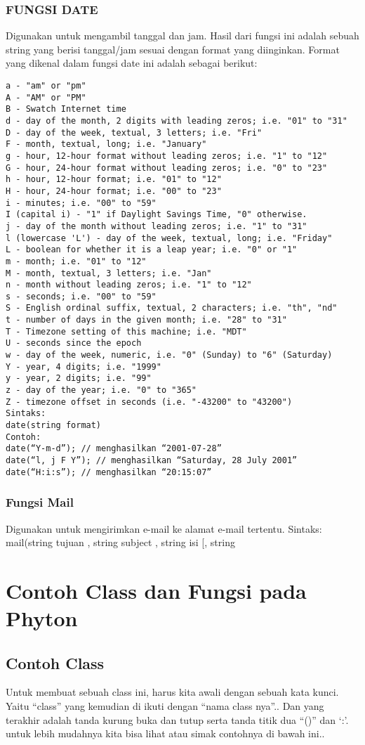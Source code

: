 \subsubsection{FUNGSI DATE}
Digunakan untuk mengambil tanggal dan jam. Hasil dari fungsi ini adalah sebuah string
yang berisi tanggal/jam sesuai dengan format yang diinginkan. Format yang dikenal
dalam fungsi date ini adalah sebagai berikut:
\begin{verbatim}
a - "am" or "pm"
A - "AM" or "PM"
B - Swatch Internet time
d - day of the month, 2 digits with leading zeros; i.e. "01" to "31"
D - day of the week, textual, 3 letters; i.e. "Fri"
F - month, textual, long; i.e. "January"
g - hour, 12-hour format without leading zeros; i.e. "1" to "12"
G - hour, 24-hour format without leading zeros; i.e. "0" to "23"
h - hour, 12-hour format; i.e. "01" to "12"
H - hour, 24-hour format; i.e. "00" to "23"
i - minutes; i.e. "00" to "59"
I (capital i) - "1" if Daylight Savings Time, "0" otherwise.
j - day of the month without leading zeros; i.e. "1" to "31"
l (lowercase 'L') - day of the week, textual, long; i.e. "Friday"
L - boolean for whether it is a leap year; i.e. "0" or "1"
m - month; i.e. "01" to "12"
M - month, textual, 3 letters; i.e. "Jan"
n - month without leading zeros; i.e. "1" to "12"
s - seconds; i.e. "00" to "59"
S - English ordinal suffix, textual, 2 characters; i.e. "th", "nd"
t - number of days in the given month; i.e. "28" to "31"
T - Timezone setting of this machine; i.e. "MDT"
U - seconds since the epoch
w - day of the week, numeric, i.e. "0" (Sunday) to "6" (Saturday)
Y - year, 4 digits; i.e. "1999"
y - year, 2 digits; i.e. "99"
z - day of the year; i.e. "0" to "365"
Z - timezone offset in seconds (i.e. "-43200" to "43200")
Sintaks:
date(string format)
Contoh:
date(“Y-m-d”); // menghasilkan “2001-07-28”
date(“l, j F Y”); // menghasilkan “Saturday, 28 July 2001”
date(“H:i:s”); // menghasilkan “20:15:07”
\end{verbatim}

\subsubsection{Fungsi Mail}
Digunakan untuk mengirimkan e-mail ke alamat e-mail tertentu.
Sintaks:
mail(string tujuan , string subject , string isi [, string

\section{Contoh Class dan Fungsi pada Phyton}
\subsection{Contoh Class}
Untuk membuat sebuah class ini, harus kita awali dengan sebuah kata kunci. Yaitu “class” yang kemudian di ikuti dengan 
“nama class nya”.. Dan yang terakhir adalah tanda kurung buka dan tutup serta tanda titik dua “()” dan ‘:’.  untuk lebih
mudahnya kita bisa lihat atau simak contohnya di bawah ini..

